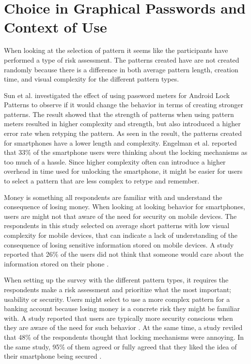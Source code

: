   \section{Choice in Graphical Passwords and Context of Use}\label{sec:discussionContext}
    
    When looking at the selection of pattern it seems like the participants have performed a type of risk assessment. The patterns created have are not created randomly because there is a difference in both average pattern length, creation time, and visual complexity for the different pattern types.

    Sun et al. \cite{Sun} investigated the effect of using password meters for Android Lock Patterns to observe if it would change the behavior in terms of creating stronger patterns. The result showed that the strength of patterns when using pattern meters resulted in higher complexity and strength, but also introduced a higher error rate when retyping the pattern. As seen in the result, the patterns created for smartphones have a lower length and complexity. Engelman et al. \cite{Egelman} reported that 33\% of the smartphone users were thinking about the locking mechanisms as too much of a hassle. Since higher complexity often can introduce a higher overhead in time used for unlocking the smartphone, it might be easier for users to select a pattern that are less complex to retype and remember.   

    Money is something all respondents are familiar with and understand the consequence of losing money. When looking at looking behavior for smartphones, users are might not that aware of the need for security on mobile devices. The respondents in this study selected on average short patterns with low visual complexity for mobile devices, that can indicate a lack of understanding of the consequence of losing sensitive information stored on mobile devices. A study reported that 26\% of the users did not think that someone would care about the information stored on their phone \cite{Egelman}. 

    When setting up the survey with the different pattern types, it requires the respondents make a risk assessment and prioritize what the most important; usability or security. Users might select to use a more complex pattern for a banking account because losing money is a concrete risk they might be familiar with. A study reported that users are typically more security conscious when they are aware of the need for such behavior \cite{Sasse}. At the same time, a study reviled that 48\% of the respondents thought that locking mechanisms were annoying. In the same study, 95\% of them agreed or fully agreed that they liked the idea of their smartphone being secured \cite{habits3}. 

